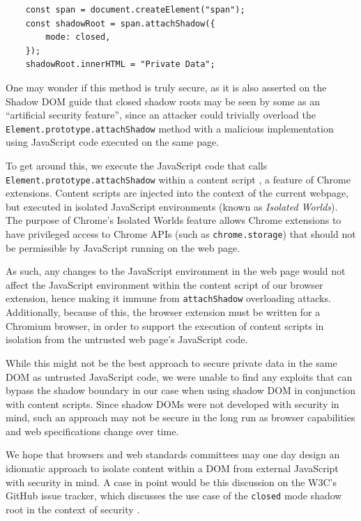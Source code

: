 \documentclass[letterpaper,twocolumn,10pt]{article}
\begin{document}
\begin{center}
    \begin{lstlisting}
    const span = document.createElement("span");
    const shadowRoot = span.attachShadow({
        mode: closed,
    });
    shadowRoot.innerHTML = "Private Data";
    \end{lstlisting}
    \label{fig:shadow_root}
\end{center}

One may wonder if this method is truly secure, as it is also asserted on the Shadow DOM guide \cite{Bidelman} that closed shadow roots may be seen by some as an ``artificial security feature'', since an attacker could trivially overload the \texttt{Element.prototype.attachShadow} method with a malicious implementation using JavaScript code executed on the same page.

To get around this, we execute the JavaScript code that calls \texttt{Element.prototype.attachShadow} within a content script \cite{ContentScript}, a feature of Chrome extensions. Content scripts are injected into the context of the current webpage, but executed in isolated JavaScript environments (known as \textit{Isolated Worlds}). The purpose of Chrome's Isolated Worlds feature allows Chrome extensions to have privileged access to Chrome APIs (such as \texttt{chrome.storage}) that should not be permissible by JavaScript running on the web page.

As such, any changes to the JavaScript environment in the web page would not affect the JavaScript environment within the content script of our browser extension, hence making it immune from \texttt{attachShadow} overloading attacks. Additionally, because of this, the browser extension must be written for a Chromium browser, in order to support the execution of content scripts in isolation from the untrusted web page's JavaScript code.

While this might not be the best approach to secure private data in the same DOM as untrusted JavaScript code, we were unable to find any exploits that can bypass the shadow boundary in our case when using shadow DOM in conjunction with content scripts. Since shadow DOMs were not developed with security in mind, such an approach may not be secure in the long run as browser capabilities and web specifications change over time.

We hope that browsers and web standards committees may one day design an idiomatic approach to isolate content within a DOM from external JavaScript with security in mind. A case in point would be this discussion on the W3C's GitHub issue tracker, which discusses the use case of the \texttt{closed} mode shadow root in the context of security \cite{GitHubW3C}.
\end{document}
